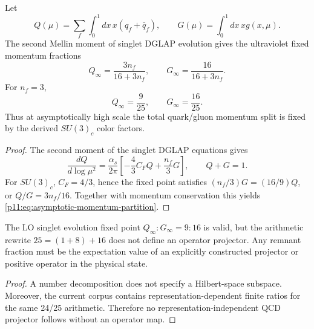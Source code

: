 \documentclass[12pt,a4paper]{article}
\begin{document}
\begin{theorem}
\label{p11:thm:asymptotic-quark-gluon-momentum-partition}
Let
\begin{equation}
Q(\mu)=\sum_f\int_0^1dx\,x(q_f+\bar q_f),
\qquad
G(\mu)=\int_0^1dx\,xg(x,\mu).
\end{equation}
The second Mellin moment of singlet DGLAP evolution gives the ultraviolet fixed momentum fractions
\begin{equation}
\label{p11:eq:asymptotic-momentum-partition}
Q_\infty=\frac{3n_f}{16+3n_f},
\qquad
G_\infty=\frac{16}{16+3n_f}.
\end{equation}
For \(n_f=3\),
\begin{equation}
\label{p11:eq:asymptotic-momentum-partition-three-flavors}
Q_\infty=\frac9{25},
\qquad
G_\infty=\frac{16}{25}.
\end{equation}
Thus at asymptotically high scale the total quark/gluon momentum split is fixed by the derived \(SU(3)_c\) color factors.
\end{theorem}
\begin{proof}
The second moment of the singlet DGLAP equations gives
\begin{equation}
\frac{dQ}{d\log\mu^2}=\frac{\alpha_s}{2\pi}\left[-\frac43C_FQ+\frac{n_f}{3}G\right],
\qquad
Q+G=1.
\end{equation}
For \(SU(3)_c\), \(C_F=4/3\), hence the fixed point satisfies \((n_f/3)G=(16/9)Q\), or \(Q/G=3n_f/16\).  Together with momentum conservation this yields \eqref{p11:eq:asymptotic-momentum-partition}.\qedhere
\end{proof}

\begin{corollary}
\label{p11:cor:qcd-remnant-envelope-25-support}

The LO singlet evolution fixed point \(Q_\infty:G_\infty=9:16\) is valid, but the arithmetic rewrite \(25=(1+8)+16\) does not define an operator projector.  Any remnant fraction must be the expectation value of an explicitly constructed projector or positive operator in the physical state.
\label{p11:eq:hidden-eta-qcd-envelope}
\end{corollary}
\begin{proof}

A number decomposition does not specify a Hilbert-space subspace.  Moreover, the current corpus contains representation-dependent finite ratios for the same 24/25 arithmetic.  Therefore no representation-independent QCD projector follows without an operator map.
\end{proof}
\end{document}
